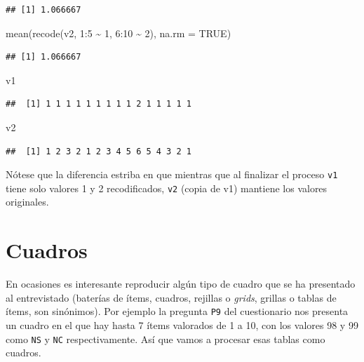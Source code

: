\documentclass[
]{book}
\newenvironment{Shaded}{\begin{snugshade}}{\end{snugshade}}
\newcommand{\AttributeTok}[1]{\textcolor[rgb]{0.77,0.63,0.00}{#1}}
\newcommand{\ConstantTok}[1]{\textcolor[rgb]{0.00,0.00,0.00}{#1}}
\newcommand{\DecValTok}[1]{\textcolor[rgb]{0.00,0.00,0.81}{#1}}
\newcommand{\FunctionTok}[1]{\textcolor[rgb]{0.00,0.00,0.00}{#1}}
\newcommand{\NormalTok}[1]{#1}
\newcommand{\SpecialCharTok}[1]{\textcolor[rgb]{0.00,0.00,0.00}{#1}}
\begin{document}
\begin{verbatim}
## [1] 1.066667
\end{verbatim}

\begin{Shaded}
\begin{Highlighting}[]
\FunctionTok{mean}\NormalTok{(}\FunctionTok{recode}\NormalTok{(v2, }\DecValTok{1}\SpecialCharTok{:}\DecValTok{5} \SpecialCharTok{\textasciitilde{}} \DecValTok{1}\NormalTok{, }\DecValTok{6}\SpecialCharTok{:}\DecValTok{10} \SpecialCharTok{\textasciitilde{}} \DecValTok{2}\NormalTok{), }\AttributeTok{na.rm =} \ConstantTok{TRUE}\NormalTok{)}
\end{Highlighting}
\end{Shaded}

\begin{verbatim}
## [1] 1.066667
\end{verbatim}

\begin{Shaded}
\begin{Highlighting}[]
\NormalTok{v1}
\end{Highlighting}
\end{Shaded}

\begin{verbatim}
##  [1] 1 1 1 1 1 1 1 1 1 2 1 1 1 1 1
\end{verbatim}

\begin{Shaded}
\begin{Highlighting}[]
\NormalTok{v2}
\end{Highlighting}
\end{Shaded}

\begin{verbatim}
##  [1] 1 2 3 2 1 2 3 4 5 6 5 4 3 2 1
\end{verbatim}

Nótese que la diferencia estriba en que mientras que al finalizar el proceso \texttt{v1} tiene solo valores 1 y 2 recodificados, \texttt{v2} (copia de v1) mantiene los valores originales.

\hypertarget{cuadros}{%
\section{Cuadros}\label{cuadros}}

En ocasiones es interesante reproducir algún tipo de cuadro que se ha presentado al entrevistado (baterías de ítems, cuadros, rejillas o \emph{grids}, grillas o tablas de ítems, son sinónimos). Por ejemplo la pregunta \texttt{P9} del cuestionario nos presenta un cuadro en el que hay hasta 7 ítems valorados de 1 a 10, con los valores 98 y 99 como \texttt{NS} y \texttt{NC} respectivamente. Así que vamos a procesar esas tablas como cuadros.
\end{document}
